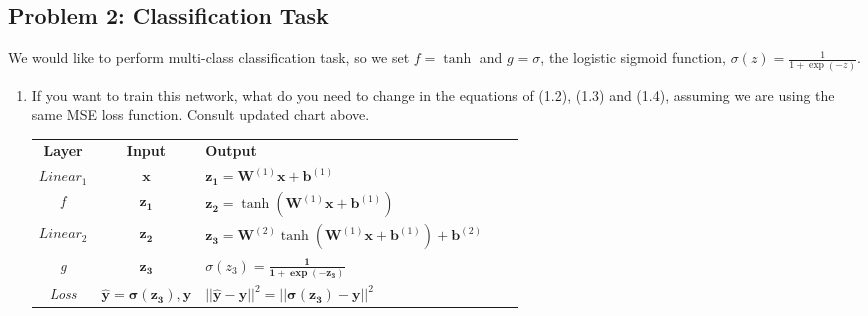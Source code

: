 \documentclass{article}
\begin{document}
\subsection*{Problem 2: Classification Task}
We would like to perform multi-class classification task, so we set $f = \tanh$
and $g = \sigma$, the logistic sigmoid function,
$\sigma(z)=\frac{1}{1+\exp(-z)}$.
\begin{enumerate}
  \item If you want to train this network, what do you need to change in the
        equations of (1.2), (1.3) and (1.4), assuming we are using the same MSE loss
        function. Consult updated chart above.
        \begin{table}[]
          \begin{tcolorbox}
            \centering
            \begin{tabular}{|c|c|l|cc}
              \cline{1-3}
              \textbf{Layer}                                  & \textbf{Input} & \textbf{Output} &  & \\
              \cline{1-3}
              \textit{$Linear_1$}                             & $\bm{x}$       &
              $\bm{z_1}=\bm{W}^{(1)}\bm{x}+\bm{b}^{(1)}$      &                &                      \\ \cline{1-3}
              \textit{f}                                      & $\bm{z_1}$     &
              $\bm{z_2}=\tanh(\bm{W}^{(1)}\bm{x}+\bm{b}^{(1)})$ &                &                      \\
              \cline{1-3}
              \textit{$Linear_2$}                             & $\bm{z_2}$     &
              $\bm{z_3}=\bm{W}^{(2)}\tanh(\bm{W}^{(1)}\bm{x}+\bm{b}^{(1)})+\bm{b}^{(2)}$
                                                              &                &                      \\ \cline{1-3}
              \textit{g}                                      & $\bm{z_3}$     & $\sigma(z_3)=\bm{\frac{1}{1+\exp(-z_3)}}$
                                                              &                &                      \\ \cline{1-3}
              \textit{Loss}                                   & $\bm{\hat{y}=\sigma(z_3), y}$  &
              $||\bm{\hat{y}-y}||^2=||\bm{\sigma(z_3)}-\bm{y}||^2$
                                                              &                &                      \\ \cline{1-3}
            \end{tabular}
          \end{tcolorbox}
        \end{table}
        

\end{enumerate}
\end{document}
